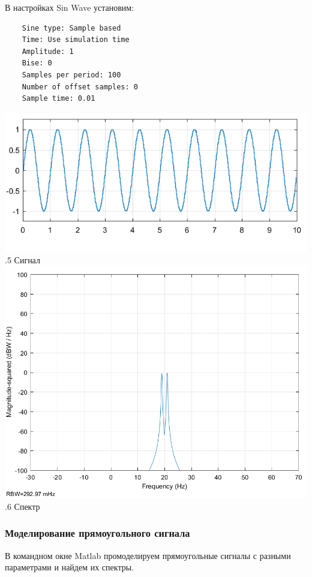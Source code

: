 \documentclass[a4paper]{article}
\begin{document}
В настройках Sin Wave установим:
\begin{verbatim}
	Sine type: Sample based
	Time: Use simulation time
	Amplitude: 1
	Bise: 0
	Samples per period: 100
	Number of offset samples: 0
	Sample time: 0.01
\end{verbatim}

	\center\includegraphics[scale = 0.5]{pictures/S.png} 
	\\ .5 Сигнал
	\center\includegraphics[scale = 0.5]{pictures/ms_S.png} 
	\\ .6 Спектр

\newpage

\subsubsection{Моделирование прямоугольного сигнала}
В командном окне Matlab промоделируем прямоугольные сигналы с разными параметрами и найдем их спектры. 
\end{document}
